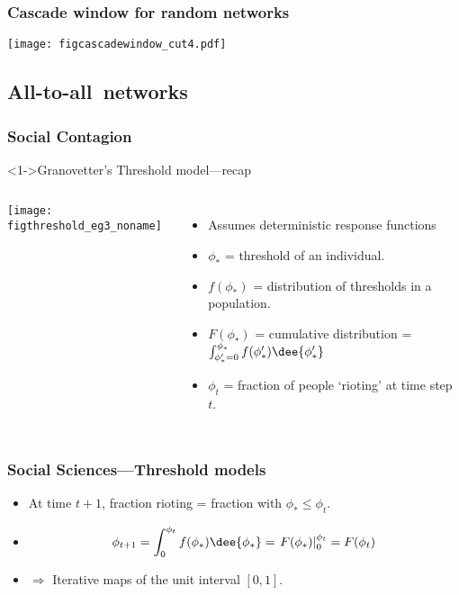 \begin{frame}
  \frametitle{Cascade window for random networks}

  \texttt{[image: figcascadewindow\_cut4.pdf]}

\end{frame}



\subsection{All-to-all\ networks}

\begin{frame}
  \frametitle{Social Contagion}
  
  \begin{block}<1->{Granovetter's Threshold model---recap}
    \begin{columns}
      \texttt{[image: figthreshold\_eg3\_noname]}
      \begin{itemize}
      \item<1-> Assumes deterministic response functions
      \item<2-> $\phi_\ast$ = threshold of an individual.
      \item<3-> $f(\phi_\ast)$ = distribution of thresholds in a population.
      \item<4-> $F(\phi_\ast)$ = cumulative distribution = $\int_{\phi_\ast'=0}^{\phi_\ast} f(\phi_\ast') \dee{\phi_\ast'}$
      \item<5-> $\phi_t$ = fraction of people `rioting' at time step $t$.
      \end{itemize}
    \end{columns}
  \end{block}
  
\end{frame}

\begin{frame}
  \frametitle{Social Sciences---Threshold models}
 
   \begin{itemize}
   \item<1->
   At time $t+1$, fraction rioting
   = fraction with $\phi_\ast \le \phi_t$.
   \item<2->
   \[ \phi_{t+1} = \int_{0}^{\phi_t} f(\phi_\ast) \dee{\phi_\ast}
   = \left. F(\phi_\ast) \right|_{0}^{\phi_t} = F(\phi_t) \]
   \item<3->
   $\Rightarrow$ Iterative maps of the unit interval $[0, 1]$.
   \end{itemize}

\end{frame}

